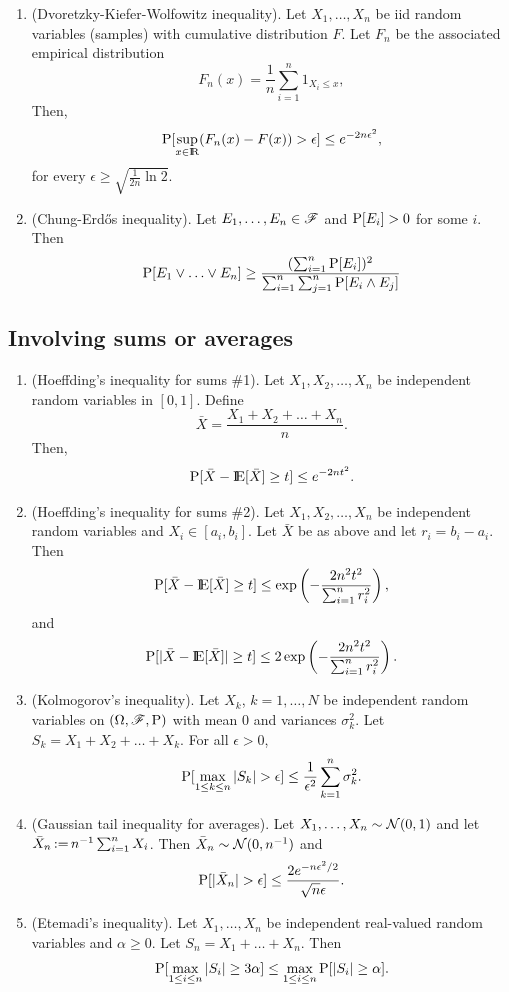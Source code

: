 \documentclass[a4paper,10pt]{article}
\begin{document}
\begin{enumerate}
\item (Dvoretzky-Kiefer-Wolfowitz inequality). Let $X_1,\ldots, X_n$ be iid random variables (samples)
      with cumulative distribution $F$. Let $F_n$ be the associated empirical distribution
      \[
       F_n(x) = \frac{1}{n}\sum_{i=1}^n 1_{X_i\leq x},
      \]
      Then,
      \[
       \prob[\sup_{x\in\Re}(F_n(x) - F(x)) > \epsilon] \leq e^{-2n\epsilon^2},
      \]
      for every $\epsilon \geq \sqrt{\tfrac{1}{2n}\ln 2}$.
\item (Chung-Erd\H{o}s inequality). Let $E_1,\ldots, E_n\in\mathscr{F}$ and $\mathrm{P}[E_i]>0$ for some $i$. Then 
      \[
       \mathrm{P}[E_1 \vee \ldots \vee E_n] \geq \frac{(\sum_{i=1}^{n}\mathrm{P}[E_i])^2}{\sum_{i=1}^{n}\sum_{j=1}^{n}\mathrm{P}[E_i\wedge E_j]}
      \]

\end{enumerate}

\subsection{Involving sums or averages}
\begin{enumerate}
 \item (Hoeffding's inequality for sums \#1). Let $X_1,X_2,\ldots, X_n$ be independent random variables in $[0,1]$. Define 
  \[
  \bar{X} = \frac{X_1 + X_2 + \ldots + X_n}{n}.
  \]
  Then,
  \[
  \prob[\bar{X} - \E[\bar{X}] \geq t] \leq e^{-2nt^2}.
  \]
\item (Hoeffding's inequality for sums \#2). Let $X_1,X_2,\ldots, X_n$ be independent random variables and $X_i\in [a_i, b_i]$.
  Let $\bar{X}$ be as above and let $r_i = b_i - a_i$. Then
  \[
  \prob[\bar{X} - \E[\bar{X}] \geq t] \leq \exp\left({-\frac{2n^2t^2}{\sum_{i=1}^{n} r_i^2}}\right),
  \]
  and
  \[
  \prob[ |\bar{X} - \E[\bar{X}]| \geq t] \leq 2 \exp\left({-\frac{2n^2t^2}{\sum_{i=1}^{n} r_i^2}}\right).
  \]
\item (Kolmogorov's inequality). Let $X_k$, $k=1,\ldots, N$ be independent random variables on $(\Omega,\mathscr{F},\mathrm{P})$
      with mean $0$ and variances $\sigma_k^2$. Let $S_k = X_1 + X_2 + \ldots + X_k$. For all $\epsilon>0$,
      \[
       \prob[\max_{1\leq k\leq n}|S_k|>\epsilon] \leq \frac{1}{\epsilon^2}\sum_{k=1}^{n}\sigma_k^2.
      \]
\item (Gaussian tail inequality for averages). Let $X_1,\ldots,X_n\sim \mathcal N(0,1)$ and 
      let $\bar{X}_n {}\mathop{\mathrel{:}=}{} n^{-1}\sum_{i=1}^{n}X_i$. Then $\bar{X}_n\sim \mathcal N(0,n^{-1})$ and
      \[
       \prob[|\bar{X}_n|>\epsilon] \leq \frac{2e^{-n\epsilon^2/2}}{\sqrt{n}\epsilon}.
      \]
\item (Etemadi's inequality). Let $X_1,\ldots, X_n$ be independent real-valued random variables and $\alpha\geq 0$.
      Let $S_n = X_1 + \ldots + X_n$. Then
      \[
       \mathrm{P}[\max_{1\leq i \leq n}|S_i|\geq 3\alpha]\leq \max_{1\leq i \leq n}\mathrm{P}[|S_i|\geq \alpha].
      \]

\end{enumerate}
\end{document}
